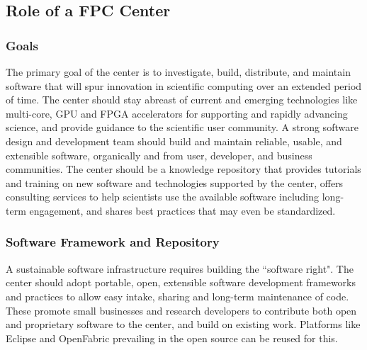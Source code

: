 \subsection{Role of a FPC Center}
%
%
%
%
%

\subsubsection{Goals}
The primary goal of the center is to investigate, build, distribute, and maintain software that will spur innovation in scientific computing over an extended period of time. The center should stay abreast of current and emerging technologies like multi-core, GPU and FPGA accelerators for supporting and rapidly advancing science, and provide guidance to the scientific user community. A strong software design and development team should build and maintain reliable, usable, and extensible software, organically and from user, developer, and business communities. The center should be a knowledge repository that provides tutorials and training on new software and technologies supported by the center, offers consulting services to help scientists use the available software including long-term engagement, and shares best practices that may even be standardized.

\subsubsection{Software Framework and Repository}
A sustainable software infrastructure requires building the ``software right". The center should adopt portable, open, extensible software development frameworks and practices to allow easy intake, sharing and long-term maintenance of code. These promote small businesses and research developers to contribute both open and proprietary software to the center, and build on existing work. Platforms like Eclipse and OpenFabric prevailing in the open source can be reused for this.

